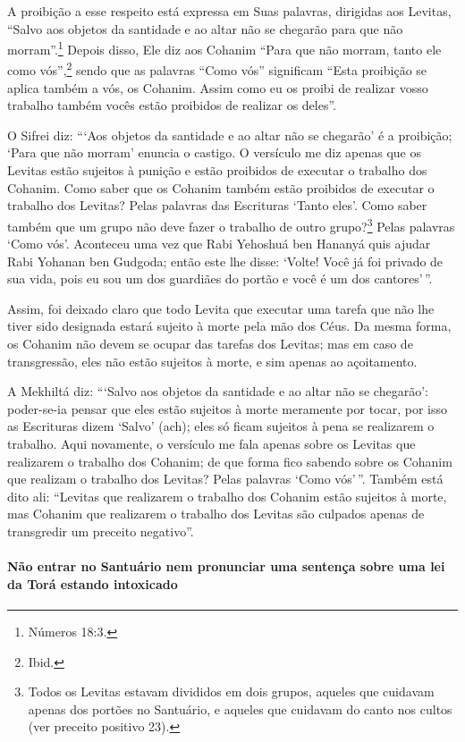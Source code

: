 A proibição a esse respeito está expressa em Suas palavras, dirigidas
aos Levitas, ``Salvo aos objetos da santidade e ao altar não se chegarão
para que não morram''.\footnote{Números 18:3.} Depois disso, Ele diz aos
Cohanim ``Para que não morram, tanto ele como vós'',\footnote{Ibid.} sendo
que as palavras ``Como vós'' significam ``Esta proibição se aplica
também a vós, os Cohanim. Assim como eu os proibi de realizar vosso
trabalho também vocês estão proibidos de realizar os deles''.

O Sifrei diz: ```Aos objetos da santidade e ao altar não se chegarão' é
a proibição; `Para que não morram' enuncia o castigo. O versículo me diz
apenas que os Levitas estão sujeitos à punição e estão proibidos de
executar o trabalho dos Cohanim. Como saber que os Cohanim também
estão proibidos de executar o trabalho dos Levitas? Pelas palavras das
Escrituras `Tanto eles'. Como saber também que um grupo não deve fazer o
trabalho de outro grupo?\footnote{Todos os Levitas estavam divididos em dois grupos, aqueles que cuidavam apenas dos portões no Santuário, e aqueles que cuidavam do
canto nos cultos (ver preceito positivo 23).} Pelas palavras `Como
vós'. Aconteceu uma vez que Rabi Yehoshuá ben Hananyá quis ajudar Rabi
Yohanan ben Gudgoda; então este lhe disse: `Volte! Você já foi privado
de sua vida, pois eu sou um dos guardiães do portão e você é um dos
cantores'\,''.

Assim, foi deixado claro que todo Levita que executar uma tarefa que não
lhe tiver sido designada estará sujeito à morte pela mão dos Céus. Da
mesma forma, os Cohanim não devem se ocupar das tarefas dos Levitas;
mas em caso de transgressão, eles não estão sujeitos à morte, e sim
apenas ao açoitamento.

A Mekhiltá diz: ```Salvo aos objetos da santidade e ao altar não se
chegarão': poder-se-ia pensar que eles estão sujeitos à morte meramente
por tocar, por isso as Escrituras dizem `Salvo' (ach); eles só ficam
sujeitos à pena se realizarem o trabalho. Aqui novamente, o versículo me
fala apenas sobre os Levitas que realizarem o trabalho dos Cohanim; de
que forma fico sabendo sobre os Cohanim que realizam o trabalho dos Levitas? Pelas palavras `Como
vós'\,''. Também está dito ali: ``Levitas que realizarem o trabalho dos
Cohanim estão sujeitos à morte, mas Cohanim que realizarem o
trabalho dos Levitas são culpados apenas de transgredir um preceito
negativo''.

\paragraph{Não entrar no Santuário nem pronunciar uma
sentença sobre uma lei da Torá estando intoxicado}

